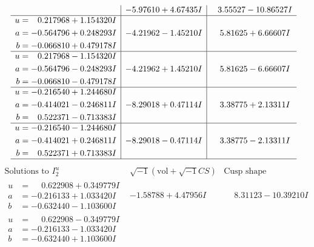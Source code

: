 \documentclass[1p]{elsarticle_modified}
\theoremstyle{definition}
\newcommand{\I}{\sqrt{-1}}
\begin{document}
$$\begin{array}{c|c|c}
 & -5.97610 + 4.67435 I & \phantom{-}3.55527 - 10.86527 I \\ \hline\begin{aligned}
u &= \phantom{-}0.217968 + 1.154320 I \\
a &= -0.564796 + 0.248293 I \\
b &= -0.066810 + 0.479178 I\end{aligned}
 & -4.21962 - 1.45210 I & \phantom{-}5.81625 + 6.66607 I \\ \hline\begin{aligned}
u &= \phantom{-}0.217968 - 1.154320 I \\
a &= -0.564796 - 0.248293 I \\
b &= -0.066810 - 0.479178 I\end{aligned}
 & -4.21962 + 1.45210 I & \phantom{-}5.81625 - 6.66607 I \\ \hline\begin{aligned}
u &= -0.216540 + 1.244680 I \\
a &= -0.414021 - 0.246811 I \\
b &= \phantom{-}0.522371 - 0.713383 I\end{aligned}
 & -8.29018 + 0.47114 I & \phantom{-}3.38775 + 2.13311 I \\ \hline\begin{aligned}
u &= -0.216540 - 1.244680 I \\
a &= -0.414021 + 0.246811 I \\
b &= \phantom{-}0.522371 + 0.713383 I\end{aligned}
 & -8.29018 - 0.47114 I & \phantom{-}3.38775 - 2.13311 I\\
 \hline 
 \end{array}$$\newpage$$\begin{array}{c|c|c}  
\text{Solutions to }I^u_{2}& \I (\text{vol} + \sqrt{-1}CS) & \text{Cusp shape}\\
 \hline 
\begin{aligned}
u &= \phantom{-}0.622908 + 0.349779 I \\
a &= -0.216133 + 1.033420 I \\
b &= -0.632440 - 1.103600 I\end{aligned}
 & -1.58788 + 4.47956 I & \phantom{-}8.31123 - 10.39210 I \\ \hline\begin{aligned}
u &= \phantom{-}0.622908 - 0.349779 I \\
a &= -0.216133 - 1.033420 I \\
b &= -0.632440 + 1.103600 I\end{aligned}

\end{array}$$
\end{document}
